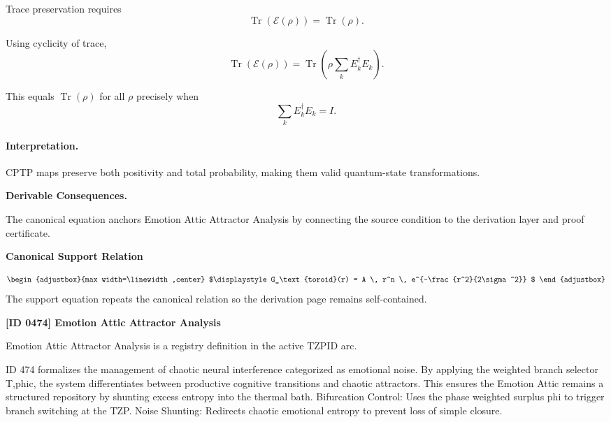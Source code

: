 Trace preservation requires
\begin{equation}
\operatorname{Tr}(\mathcal{E}(\rho))=\operatorname{Tr}(\rho).
\end{equation}

Using cyclicity of trace,
\begin{equation}
\operatorname{Tr}(\mathcal{E}(\rho))
=
\operatorname{Tr}\left(
\rho\sum_k E_k^\dagger E_k
\right).
\end{equation}

This equals $\operatorname{Tr}(\rho)$ for all $\rho$ precisely when
\begin{equation}
\boxed{
\sum_k E_k^\dagger E_k = I .
}
\end{equation}

\paragraph{Interpretation.}
CPTP maps preserve both positivity and total probability, making them valid quantum-state transformations.

\par\vspace{0.35em}
\noindent\textbf{Derivable Consequences.}\quad
\begingroup
\footnotesize
\raggedright
The canonical equation anchors Emotion Attic Attractor Analysis by connecting the source condition to the derivation layer and proof certificate.
\par\endgroup

\noindent\textbf{Canonical Support Relation}\par
\[
\begin{adjustbox}{max width=\linewidth,center}
$\displaystyle
G_\text{toroid}(r) = A \, r^n \, e^{-\frac{r^2}{2\sigma^2}}
$
\end{adjustbox}
\]
\noindent The support equation repeats the canonical relation so the derivation page remains self-contained.\par

\clearpage
\noindent\textbf{[ID 0474] Emotion Attic Attractor Analysis}\par
\vspace{0.35em}
\begingroup\small
{}
Emotion Attic Attractor Analysis is a registry definition in the active TZPID arc.

ID 474 formalizes the management of chaotic neural interference categorized as emotional noise. By applying the weighted branch selector T,phic, the system differentiates between productive cognitive transitions and chaotic attractors. This ensures the Emotion Attic remains a structured repository by shunting excess entropy into the thermal bath. Bifurcation Control: Uses the phase weighted surplus phi to trigger branch switching at the TZP. Noise Shunting: Redirects chaotic emotional entropy to prevent loss of simple closure.

